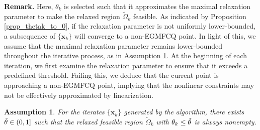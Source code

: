 \documentclass[aos]{imsart}
\numberwithin{equation}{section}
\theoremstyle{plain}
\newtheorem{assumption}{Assumption}
\begin{document}
\textbf{Remark.} Here, $\theta_k$ is selected such that it approximates the maximal relaxation parameter to make the relaxed region $\widetilde{\Omega}_k$ feasible. As indicated by Proposition \ref{prop_thetak_to_0}, if the relaxation parameter is not uniformly lower-bounded, a subsequence of $\{\bm{x}_k\}$ will converge to a non-EGMFCQ point. In light of this, we assume that the maximal relaxation parameter remains lower-bounded throughout the iterative process, as in Assumption \ref{assump1}. At the beginning of each iteration, we first examine the relaxation parameter to ensure that it exceeds a predefined threshold. Failing this, we deduce that the current point is approaching a non-EGMFCQ point, implying that the nonlinear constraints may not be effectively approximated by linearization.

\begin{assumption}
\label{assump1}
For the iterates $\{\bm{x}_k\}$ generated by the algorithm, there exists $\Tilde{\theta} \in (0,1]$ such that the relaxed feasible region $\widetilde{\Omega}_k$ with $\theta_k \leq \Tilde{\theta}$ is always nonempty.
\end{assumption}
\end{document}
